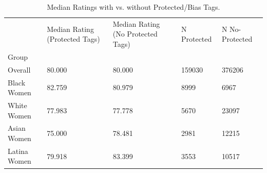 \begin{table}[htbp]
\centering
\caption{Median Ratings with vs. without Protected/Bias Tags.}
\label{tab:eda_protected_rating_medians}
\begin{tabular}{lllll}
\toprule
 & Median Rating (Protected Tags) & Median Rating (No Protected Tags) & N Protected & N No-Protected \\
Group &  &  &  &  \\
\midrule
Overall & 80.000 & 80.000 & 159030 & 376206 \\
Black Women & 82.759 & 80.979 & 8999 & 6967 \\
White Women & 77.983 & 77.778 & 5670 & 23097 \\
Asian Women & 75.000 & 78.481 & 2981 & 12215 \\
Latina Women & 79.918 & 83.399 & 3553 & 10517 \\
\bottomrule
\end{tabular}

\end{table}